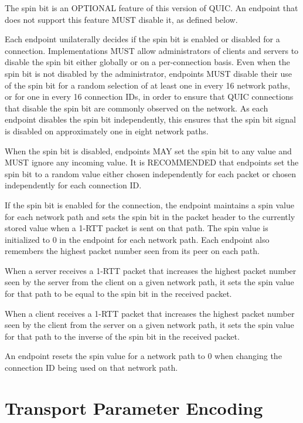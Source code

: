 \documentclass{article}
\begin{document}
The spin bit is an OPTIONAL feature of this version of QUIC.  An endpoint that does not support this feature MUST disable it, as defined below.

Each endpoint unilaterally decides if the spin bit is enabled or disabled for a connection.  Implementations MUST allow administrators of clients and servers to disable the spin bit either globally or on a per-connection basis.  Even when the spin bit is not disabled by the administrator, endpoints MUST disable their use of the spin bit for a random selection of at least one in every 16 network paths, or for one in every 16 connection IDs, in order to ensure that QUIC connections that disable the spin bit are commonly observed on the network.  As each endpoint disables the spin bit independently, this ensures that the spin bit signal is disabled on approximately one in eight network paths.

When the spin bit is disabled, endpoints MAY set the spin bit to any value and MUST ignore any incoming value.  It is RECOMMENDED that endpoints set the spin bit to a random value either chosen independently for each packet or chosen independently for each connection ID.

If the spin bit is enabled for the connection, the endpoint maintains a spin value for each network path and sets the spin bit in the packet header to the currently stored value when a 1-RTT packet is sent on that path.  The spin value is initialized to 0 in the endpoint for each network path.  Each endpoint also remembers the highest packet number seen from its peer on each path.

When a server receives a 1-RTT packet that increases the highest packet number seen by the server from the client on a given network path, it sets the spin value for that path to be equal to the spin bit in the received packet.

When a client receives a 1-RTT packet that increases the highest packet number seen by the client from the server on a given network path, it sets the spin value for that path to the inverse of the spin bit in the received packet.

An endpoint resets the spin value for a network path to 0 when changing the connection ID being used on that network path.

\section{Transport Parameter Encoding}
\end{document}
